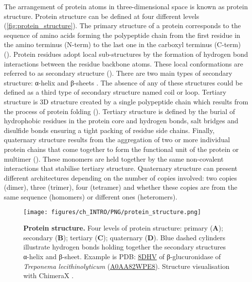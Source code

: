 The arrangement of protein atoms in three-dimensional space is known as protein structure. Protein structure can be defined at four different levels (\autoref{fig:protein_structure}). The primary structure of a protein corresponds to the sequence of amino acids forming the polypeptide chain from the first residue in the amino terminus (N-term) to the last one in the carboxyl terminus (C-term) (). Protein residues adopt local sub-structures by the formation of hydrogen bond interactions between the residue backbone atoms. These local conformations are referred to as secondary structure (). There are two main types of secondary structure: α-helix and β-sheets \cite{PAULING_1951_SS}. The absence of any of these structures could be defined as a third type of secondary structure named coil or loop. Tertiary structure is 3D structure created by a single polypeptide chain which results from the process of protein folding (). Tertiary structure is defined by the burial of hydrophobic residues in the protein core and hydrogen bonds, salt bridges and disulfide bonds ensuring a tight packing of residue side chains. Finally, quaternary structure results from the aggregation of two or more individual protein chains that come together to form the functional unit of the protein or multimer (). These monomers are held together by the same non-covalent interactions that stabilise tertiary structure. Quaternary structure can present different architectures depending on the number of copies involved: two copies (dimer), three (trimer), four (tetramer) and whether these copies are from the same sequence (homomers) or different ones (heteromers).

\begin{figure}[htb!]
    \centering
    \texttt{[image: figures/ch\_INTRO/PNG/protein\_structure.png]}
    \caption[Protein structure]{\textbf{Protein structure.} Four levels of protein structure: primary (\textbf{A}); secondary (\textbf{B}); tertiary (\textbf{C}); quaternary (\textbf{D}). Blue dashed cylinders illustrate hydrogen bonds holding together the secondary structures α-helix and β-sheet. Example is PDB: \href{https://www.ebi.ac.uk/pdbe/entry/pdb/8dhv}{8DHV} \cite{LIETZAN_2023_BETAGLUCO} of β-glucuronidase of \textit{Treponema lecithinolyticum} (\href{https://www.uniprot.org/uniprotkb/A0AA82WPE8/entry}{A0AA82WPE8}). Structure visualisation with ChimeraX \cite{PETTERSEN_2021_CHIMERAX}.}
    \label{fig:protein_structure}
\end{figure}

